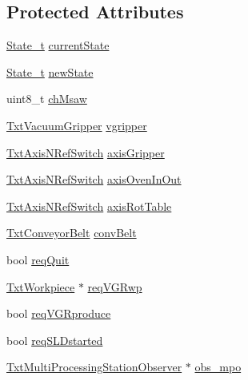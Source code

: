 \subsection*{Protected Attributes}
\begin{DoxyCompactItemize}
\item 
\hyperlink{classft_1_1_txt_multi_processing_station_a345fc850c7a3fd9062de2286a716fd2e}{State\+\_\+t} \hyperlink{classft_1_1_txt_multi_processing_station_aa6e7cf831e80c11a258aa778667384d0}{current\+State}
\item 
\hyperlink{classft_1_1_txt_multi_processing_station_a345fc850c7a3fd9062de2286a716fd2e}{State\+\_\+t} \hyperlink{classft_1_1_txt_multi_processing_station_af7f913b9865143d2b76fae771f9fa435}{new\+State}
\item 
uint8\+\_\+t \hyperlink{classft_1_1_txt_multi_processing_station_a1ca89d3f0f764e7576648484e5bd9d84}{ch\+Msaw}
\item 
\hyperlink{classft_1_1_txt_vacuum_gripper}{Txt\+Vacuum\+Gripper} \hyperlink{classft_1_1_txt_multi_processing_station_ae7185a6883fbf3ea0cd910495709476e}{vgripper}
\item 
\hyperlink{classft_1_1_txt_axis_n_ref_switch}{Txt\+Axis\+N\+Ref\+Switch} \hyperlink{classft_1_1_txt_multi_processing_station_a2340b3d052d5a07933e07b8752919fc9}{axis\+Gripper}
\item 
\hyperlink{classft_1_1_txt_axis_n_ref_switch}{Txt\+Axis\+N\+Ref\+Switch} \hyperlink{classft_1_1_txt_multi_processing_station_a357638bf052e8adf981d5cd297049a58}{axis\+Oven\+In\+Out}
\item 
\hyperlink{classft_1_1_txt_axis_n_ref_switch}{Txt\+Axis\+N\+Ref\+Switch} \hyperlink{classft_1_1_txt_multi_processing_station_a52704f5c21d82197cb2cff2845778ed2}{axis\+Rot\+Table}
\item 
\hyperlink{classft_1_1_txt_conveyor_belt}{Txt\+Conveyor\+Belt} \hyperlink{classft_1_1_txt_multi_processing_station_a4011960c442f32527a3880a77a2bf1c1}{conv\+Belt}
\item 
bool \hyperlink{classft_1_1_txt_multi_processing_station_addaf49d03f353087b40b96fb1173b959}{req\+Quit}
\item 
\hyperlink{classft_1_1_txt_workpiece}{Txt\+Workpiece} $\ast$ \hyperlink{classft_1_1_txt_multi_processing_station_a953cb7107d32b94809db4b0e8f2f9f2f}{req\+V\+G\+Rwp}
\item 
bool \hyperlink{classft_1_1_txt_multi_processing_station_afeac49b512ebfc99bf2632676d1e98c8}{req\+V\+G\+Rproduce}
\item 
bool \hyperlink{classft_1_1_txt_multi_processing_station_a3ad2570999a4e2087d29a1f4639527dc}{req\+S\+L\+Dstarted}
\item 
\hyperlink{classft_1_1_txt_multi_processing_station_observer}{Txt\+Multi\+Processing\+Station\+Observer} $\ast$ \hyperlink{classft_1_1_txt_multi_processing_station_a017a3f9bdbb577a12aaf9cc0ee301d8a}{obs\+\_\+mpo}
\end{DoxyCompactItemize}
